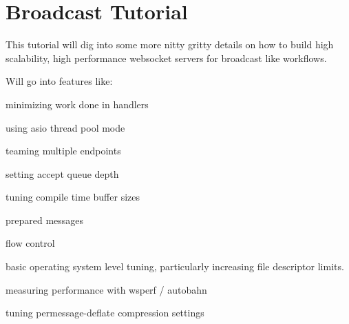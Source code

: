 \chapter{Broadcast Tutorial}
\hypertarget{md_libraries_2fc_2vendor_2websocketpp_2tutorials_2broadcast__tutorial_2broadcast__tutorial}{}\label{md_libraries_2fc_2vendor_2websocketpp_2tutorials_2broadcast__tutorial_2broadcast__tutorial}
This tutorial will dig into some more nitty gritty details on how to build high scalability, high performance websocket servers for broadcast like workflows.

Will go into features like\+:
\begin{DoxyItemize}
\item minimizing work done in handlers
\item using asio thread pool mode
\item teaming multiple endpoints
\item setting accept queue depth
\item tuning compile time buffer sizes
\item prepared messages
\item flow control
\item basic operating system level tuning, particularly increasing file descriptor limits.
\item measuring performance with wsperf / autobahn
\item tuning permessage-\/deflate compression settings 
\end{DoxyItemize}